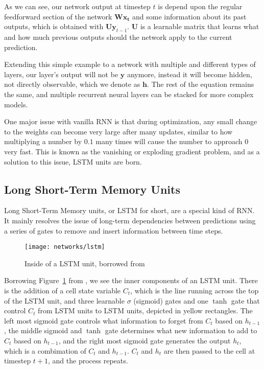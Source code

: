 \documentclass[12pt,onecolumn,letterpaper,draftclsnofoot]{article}
\newcommand{\figref}[1]{Figure~\ref{fig:#1}}
\newcommand{\bs}[1]{\boldsymbol{#1}}
\begin{document}
As we can see, our network output at timestep $t$ is depend upon the regular
feedforward section of the network $\bm{W} \bm{x_{t}}$ and some information
about its past outputs, which is obtained with $\bm{U} \bm{y}_{t-1}$. $\bm{U}$
is a learnable matrix that learns what and how much previous outputs should the
network apply to the current prediction.

Extending this simple example to a network with multiple and different types
of layers, our layer's output will not be $\bs{y}$ anymore, instead it
will become hidden, not directly observable, which we denote as
$\bs{h}$. The rest of the equation remains the same, and multiple
recurrent neural layers can be stacked for more complex models.


One major issue with vanilla RNN is that during optimization, any small change
to the weights can become very large after many updates, similar to how
multiplying a number by $0.1$ many times will cause the number to approach 0
very fast. This is known as the vanishing or exploding gradient problem, and
as a solution to this issue, LSTM units are born.

\subsection{Long Short-Term Memory Units}
Long Short-Term Memory units, or LSTM for short, are a special kind of RNN.
It mainly resolves the issue of long-term dependencies between predictions
using a series of gates to remove and insert information between time steps.
 
\begin{figure}
  \centering
  \texttt{[image: networks/lstm]}
  \caption{Inside of a LSTM unit, borrowed from \cite{colahlstm}}
  \label{fig:lstm}
\end{figure}
 
Borrowing \figref{lstm} from \cite{colahlstm}, we see the inner components of
an LSTM unit. There is the addition of a cell state variable $C_t$, which is
the line running across the top of the LSTM unit, and three learnable $\sigma$
(sigmoid) gates and one $\tanh$ gate that control $C_t$ from LSTM units to
LSTM units, depicted in yellow rectangles. The left most sigmoid gate controls
what information to forget from $C_t$ based on $h_{t-1}$, the middle sigmoid
and $\tanh$ gate determines what new information to add to $C_t$ based on
$h_{t-1}$, and the right most sigmoid gate generates the output $h_t$, which
is a combimation of $C_t$ and $h_{t-1}$. $C_t$ and $h_t$ are then passed to
the cell at timestep $t+1$, and the process repeats.
\end{document}
